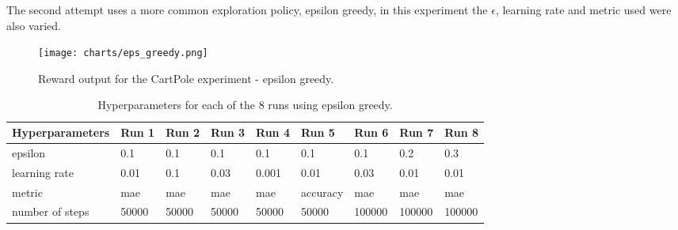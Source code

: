  The second attempt uses a more common exploration policy, epsilon greedy, in this experiment the $\epsilon$, learning rate and metric used were also varied.
 \begin{figure}[H]
 \centering
 \texttt{[image: charts/eps\_greedy.png]}
 \caption{Reward output for the CartPole experiment - epsilon greedy.}
 \end{figure}
 
\begin{center}
 \begin{table}[H]
 \caption{Hyperparameters for each of the 8 runs using epsilon greedy.}

 \begin{tabular}{|l|l|l|l|l|l|l|l|l|}
 \hline
 Hyperparameters & Run 1 & Run 2 & Run 3 & Run 4 & Run 5 & Run 6 & Run 7 & Run 8 \\ \hline
 epsilon & 0.1 & 0.1 & 0.1 & 0.1 & 0.1 & 0.1 & 0.2 & 0.3 \\ \hline
 learning rate & 0.01 & 0.1 & 0.03 & 0.001 & 0.01 & 0.03 & 0.01 & 0.01 \\ \hline
 metric & mae & mae & mae & mae & accuracy & mae & mae & mae \\ \hline
 number of steps & 50000 & 50000 & 50000 & 50000 & 50000 & 100000 & 100000& 100000 \\ \hline
 \end{tabular}
 \end{table}
\end{center}
 
